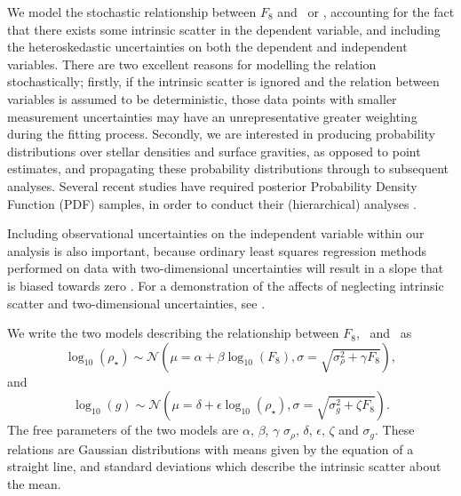 We model the stochastic relationship between $F_8$ and \logg\ or \rhostar,
accounting for the fact that there exists some intrinsic scatter in
the dependent variable, and including the heteroskedastic uncertainties on both
the dependent and independent variables.
There are two excellent reasons for modelling the relation stochastically;
firstly, if the intrinsic scatter is ignored and the relation between
variables is assumed to be deterministic, those data points with smaller
measurement uncertainties may have an unrepresentative greater weighting
during the fitting process.
Secondly, we are interested in producing probability distributions over stellar
densities and surface gravities, as opposed to point estimates, and propagating
these probability distributions through to subsequent analyses.
Several recent studies have required posterior Probability Density
Function (PDF) samples, in order to conduct their (hierarchical)
analyses \citep[e.g.][]{foreman-mackey:2014, rogers:2015, angus:2015}.

Including observational uncertainties on the independent variable within our
analysis is also important, because ordinary least squares regression methods
performed on data with two-dimensional uncertainties will result in a slope
that is biased towards zero
\citep[e.g.][]{fuller:1987, fox:1997}.
For a demonstration of the affects of neglecting intrinsic scatter and
two-dimensional uncertainties, see \citet{kelly:2007}.

We write the two models describing the relationship between $F_8$, \logg\ and
\rhostar\ as
\begin{equation}
	\log_{10}(\rho_\star) \sim \mathcal{N} \left(\mu = \alpha + \beta
	\log_{10}(F_8), \sigma = \sqrt{\sigma_{\rho}^2 + \gamma F_8}\right),
\end{equation}
\label{eq:rho}
and
\begin{equation}
	\log_{10}(g) \sim \mathcal{N}\left(\mu = \delta + \epsilon \log_{10}(\rho_\star),
	\sigma = \sqrt{\sigma_g^2 + \zeta F_8}\right).
\end{equation}
\label{eq:logg}
The free parameters of the two models are $\alpha$, $\beta$, $\gamma$
$\sigma_{\rho}$, $\delta$, $\epsilon$, $\zeta$ and $\sigma_g$.
These relations are Gaussian distributions with means
given by the equation of a straight line, and standard deviations which
describe the intrinsic scatter about the mean.

